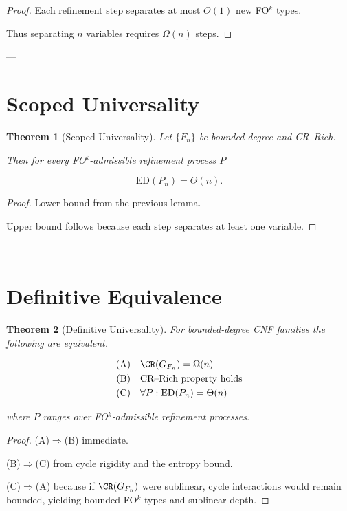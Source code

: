 \documentclass[11pt]{article}
\newtheorem{theorem}{Theorem}
\begin{document}
\begin{proof}
Each refinement step separates at most $O(1)$ new FO$^k$ types.

Thus separating $n$ variables requires $\Omega(n)$ steps.
\end{proof}

---

\section{Scoped Universality}

\begin{theorem}[Scoped Universality]
Let $\{F_n\}$ be bounded-degree and CR–Rich.

Then for every FO$^k$-admissible refinement process $P$

\[
\mathrm{ED}(P_n) = \Theta(n).
\]
\end{theorem}

\begin{proof}
Lower bound from the previous lemma.

Upper bound follows because each step separates
at least one variable.
\end{proof}

---

\section{Definitive Equivalence}

\begin{theorem}[Definitive Universality]
For bounded-degree CNF families the following are equivalent.

\begin{align}
\mathrm{(A)} & \quad \CR(G_{F_n}) = \Omega(n) \\
\mathrm{(B)} & \quad \text{CR–Rich property holds} \\
\mathrm{(C)} & \quad \forall P: \mathrm{ED}(P_n) = \Theta(n)
\end{align}

where $P$ ranges over FO$^k$-admissible refinement processes.
\end{theorem}

\begin{proof}
(A)$\Rightarrow$(B) immediate.

(B)$\Rightarrow$(C) from cycle rigidity and the entropy bound.

(C)$\Rightarrow$(A) because if $\CR(G_{F_n})$ were sublinear,
cycle interactions would remain bounded,
yielding bounded FO$^k$ types and sublinear depth.
\end{proof}
\end{document}
